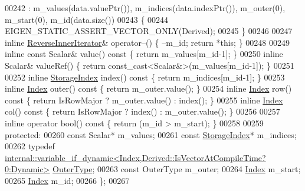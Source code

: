 \begin{DoxyCode}
00242       : m\_values(data.valuePtr()), m\_indices(data.indexPtr()), m\_outer(0), m\_start(0), m\_id(data.size())
00243     \{
00244       EIGEN\_STATIC\_ASSERT\_VECTOR\_ONLY(Derived);
00245     \}
00246 
00247     \textcolor{keyword}{inline} \hyperlink{class_eigen_1_1_sparse_compressed_base_1_1_reverse_inner_iterator}{ReverseInnerIterator}& operator--() \{ --m\_id; \textcolor{keywordflow}{return} *\textcolor{keyword}{this}; \}
00248 
00249     \textcolor{keyword}{inline} \textcolor{keyword}{const} Scalar& value()\textcolor{keyword}{ const }\{ \textcolor{keywordflow}{return} m\_values[m\_id-1]; \}
00250     \textcolor{keyword}{inline} Scalar& valueRef() \{ \textcolor{keywordflow}{return} \textcolor{keyword}{const\_cast<}Scalar&\textcolor{keyword}{>}(m\_values[m\_id-1]); \}
00251 
00252     \textcolor{keyword}{inline} \hyperlink{group___sparse_core___module_a0b540ba724726ebe953f8c0df06081ed}{StorageIndex} index()\textcolor{keyword}{ const }\{ \textcolor{keywordflow}{return} m\_indices[m\_id-1]; \}
00253     \textcolor{keyword}{inline} \hyperlink{group___core___module_a554f30542cc2316add4b1ea0a492ff02}{Index} outer()\textcolor{keyword}{ const }\{ \textcolor{keywordflow}{return} m\_outer.value(); \}
00254     \textcolor{keyword}{inline} \hyperlink{group___core___module_a554f30542cc2316add4b1ea0a492ff02}{Index} row()\textcolor{keyword}{ const }\{ \textcolor{keywordflow}{return} IsRowMajor ? m\_outer.value() : index(); \}
00255     \textcolor{keyword}{inline} \hyperlink{group___core___module_a554f30542cc2316add4b1ea0a492ff02}{Index} col()\textcolor{keyword}{ const }\{ \textcolor{keywordflow}{return} IsRowMajor ? index() : m\_outer.value(); \}
00256 
00257     \textcolor{keyword}{inline} \textcolor{keyword}{operator} bool()\textcolor{keyword}{ const }\{ \textcolor{keywordflow}{return} (m\_id > m\_start); \}
00258 
00259   \textcolor{keyword}{protected}:
00260     \textcolor{keyword}{const} Scalar* m\_values;
00261     \textcolor{keyword}{const} \hyperlink{group___sparse_core___module_a0b540ba724726ebe953f8c0df06081ed}{StorageIndex}* m\_indices;
00262     \textcolor{keyword}{typedef} 
      \hyperlink{class_eigen_1_1internal_1_1variable__if__dynamic}{internal::variable\_if\_dynamic<Index,Derived::IsVectorAtCompileTime?0:Dynamic>}
       \hyperlink{class_eigen_1_1internal_1_1variable__if__dynamic}{OuterType};
00263     \textcolor{keyword}{const} OuterType m\_outer;
00264     \hyperlink{group___core___module_a554f30542cc2316add4b1ea0a492ff02}{Index} m\_start;
00265     \hyperlink{group___core___module_a554f30542cc2316add4b1ea0a492ff02}{Index} m\_id;
00266 \};
00267 

\end{DoxyCode}
